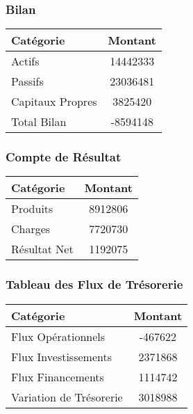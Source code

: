 \documentclass{beamer}
\begin{document}
\begin{frame}
    \frametitle{Bilan}
    \centering
    \begin{tabular}{lc}
        \toprule
        Catégorie & Montant \\
        \midrule
        Actifs & 14442333 \\
Passifs & 23036481 \\
Capitaux Propres & 3825420 \\
Total Bilan & -8594148 \\
        \bottomrule
    \end{tabular}
\end{frame}

\begin{frame}
    \frametitle{Compte de Résultat}
    \centering
    \begin{tabular}{lc}
        \toprule
        Catégorie & Montant \\
        \midrule
        Produits & 8912806 \\
Charges & 7720730 \\
Résultat Net & 1192075 \\
        \bottomrule
    \end{tabular}
\end{frame}

\begin{frame}
    \frametitle{Tableau des Flux de Trésorerie}
    \centering
    \begin{tabular}{lc}
        \toprule
        Catégorie & Montant \\
        \midrule
        Flux Opérationnels & -467622 \\
Flux Investissements & 2371868 \\
Flux Financements & 1114742 \\
Variation de Trésorerie & 3018988 \\
        \bottomrule
    \end{tabular}
\end{frame}
\end{document}
